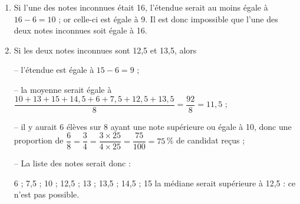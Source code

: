 
\medskip

%
%
%
%
%
%		
%
%	
%	
%		

\begin{enumerate}
\item %
Si l'une des notes inconnues était 16, l'étendue serait au moins égale à $16 - 6 = 10$ ; or celle-ci est égale à 9.
Il est donc impossible que l'une des deux notes inconnues soit égale à 16.	
\item %
Si les deux notes inconnues sont 12,5 et 13,5, alors 

-- l'étendue est égale à $15 - 6 = 9$ ;

-- la moyenne serait égale à $\dfrac{10 + 13 + 15 + 14,5 + 6 + 7,5 + 12,5 + 13,5}{8} = \dfrac{92}{8} = 11,5$ ; 

-- il y aurait 6 élèves sur 8 ayant une note supérieure ou égale à 10, donc une proportion de $\dfrac{6}{8} = \dfrac{3}{4} = \dfrac{3 \times 25}{4 \times 25} = \dfrac{75}{100} = 75$\,\% de candidat reçus ; 

-- La liste des notes serait donc :

6 ; 7,5 ; 10 ; 12,5 ; 13 ; 13,5 ; 14,5 ; 15 la médiane serait supérieure à 12,5 : ce n'est pas possible.
\end{enumerate}
